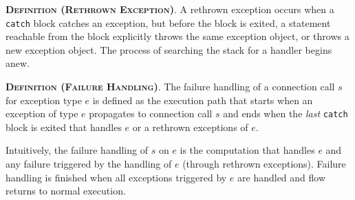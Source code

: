 \begin{description}[leftmargin=0cm,listparindent=0pt,itemindent=0cm]
\item \textsc{\bfseries{Definition (Rethrown Exception)}}.  A
rethrown exception occurs when a \lstinline!catch! block catches an
exception, but before the block is exited, a statement reachable from
the block explicitly throws the same exception object, or throws a new
exception object.  The process of searching the stack for a handler
begins anew.

\item \textsc{\bfseries{Definition (Failure Handling)}}. The failure
  handling of a connection call $s$ for exception type $e$ is defined
  as the execution path that starts when an exception of type $e$
  propagates to connection call $s$ and ends when the {\it last}
  \lstinline!catch! block is exited that handles $e$ or a rethrown
  exceptions of $e$.
\end{description}

Intuitively, the failure handling of $s$ on $e$ is the computation
that handles $e$ and any failure triggered by the handling of $e$
(through rethrown exceptions).  Failure handling is finished when all
exceptions triggered by $e$ are handled and flow returns to normal
execution.  


